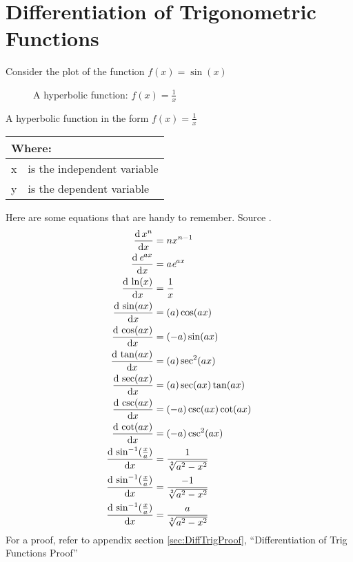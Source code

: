 \chapter{Differentiation of Trigonometric Functions}
\label{chap:DifferentiationOfTrigFunctions}
Consider the plot of the function $f(x) = \sin(x)$
\begin{figure}[!htb]
\label{fig:GraphTemplate}
\caption{A hyperbolic function: $f(x) = \frac{1}{x}$}
\end{figure}
A hyperbolic function in the form $ f(x) = \frac{1}{x}$
\begin{table}[!hbt]
\label{tab:GraphTemplateParts}
\begin{tabularx}{\linewidth}{| l X |}
  \hline
  \multicolumn{2}{|l|}{Where:} \\
  \hline \hline
  x & is the independent variable\\
  y & is the dependent variable\\
\hline
\end{tabularx}
\end{table}

Here are some equations that are handy to remember. Source \cite{RHBDiffQuickStart}.
\begin{align}
  \frac{\mathrm{d}\,x^n}{\mathrm{d}x}             & = n{x}^{n-1} \\
  \frac{\mathrm{d}\,{\emph{e}}^{ax}}{\mathrm{d}x} & = a{\emph{e}}^{ax} \\
  \frac{\mathrm{d}\,\ln(x)}{\mathrm{d}x}          & = \frac{1}{x} \\
  \frac{\mathrm{d}\,\sin(ax)}{\mathrm{d}x}        & = (a)\cos(ax) \\
  \frac{\mathrm{d}\,\cos(ax)}{\mathrm{d}x}        & = (-a)\sin(ax) \\
  \frac{\mathrm{d}\,\tan(ax)}{\mathrm{d}x}        & = (a)\sec^2(ax) \\
  \frac{\mathrm{d}\,\sec(ax)}{\mathrm{d}x}        & = (a)\sec(ax)\tan(ax) \\
  \frac{\mathrm{d}\,\csc(ax)}{\mathrm{d}x}        & = (-a)\csc(ax)\cot(ax) \\
  \frac{\mathrm{d}\,\cot(ax)}{\mathrm{d}x}        & = (-a)\csc^2(ax) \\
  \frac{\mathrm{d}\,\sin^{-1}(\frac{x}{a})}{\mathrm{d}x}
    & = \frac{1}{\sqrt[2]{{a}^{2} - {x}^{2}}} \\
  \frac{\mathrm{d}\,\sin^{-1}(\frac{x}{a})}{\mathrm{d}x}
    & = \frac{-1}{\sqrt[2]{{a}^{2} - {x}^{2}}} \\
  \frac{\mathrm{d}\,\sin^{-1}(\frac{x}{a})}{\mathrm{d}x}
    & = \frac{a}{\sqrt[2]{{a}^{2} - {x}^{2}}}
\end{align}
For a proof, refer to appendix section \ref{sec:DiffTrigProof},
``Differentiation of Trig Functions Proof''